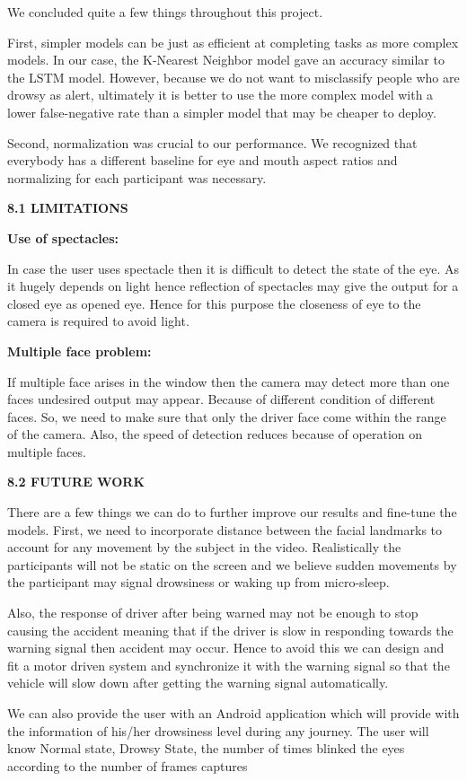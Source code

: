 \documentclass[a4paper,12pt]{article}
\begin{document}
We concluded quite a few things throughout this project.

First, simpler models can be just as efficient at completing tasks as
more complex models. In our case, the K-Nearest Neighbor model gave an
accuracy similar to the LSTM model. However, because we do not want to
misclassify people who are drowsy as alert, ultimately it is better to
use the more complex model with a lower false-negative rate than a
simpler model that may be cheaper to deploy.

Second, normalization was crucial to our performance. We recognized that
everybody has a different baseline for eye and mouth aspect ratios and
normalizing for each participant was necessary.

\textbf{8.1 LIMITATIONS}

\textbf{Use of spectacles:}

In case the user uses spectacle then it is difficult to detect the state
of the eye. As it hugely depends on light hence reflection of spectacles
may give the output for a closed eye as opened eye. Hence for this
purpose the closeness of eye to the camera is required to avoid light.

\textbf{Multiple face problem:}

If multiple face arises in the window then the camera may detect more
than one faces undesired output may appear. Because of different
condition of different faces. So, we need to make sure that only the
driver face come within the range of the camera. Also, the speed of
detection reduces because of operation on multiple faces.

\textbf{8.2 FUTURE WORK}

There are a few things we can do to further improve our results and
fine-tune the models. First, we need to incorporate distance between the
facial landmarks to account for any movement by the subject in the
video. Realistically the participants will not be static on the screen
and we believe sudden movements by the participant may signal drowsiness
or waking up from micro-sleep.

Also, the response of driver after being warned may not be enough to
stop causing the accident meaning that if the driver is slow in
responding towards the warning signal then accident may occur. Hence to
avoid this we can design and fit a motor driven system and synchronize
it with the warning signal so that the vehicle will slow down after
getting the warning signal automatically.

We can also provide the user with an Android application which will
provide with the information of his/her drowsiness level during any
journey. The user will know Normal state, Drowsy State, the number of
times blinked the eyes according to the number of frames captures
\end{document}
